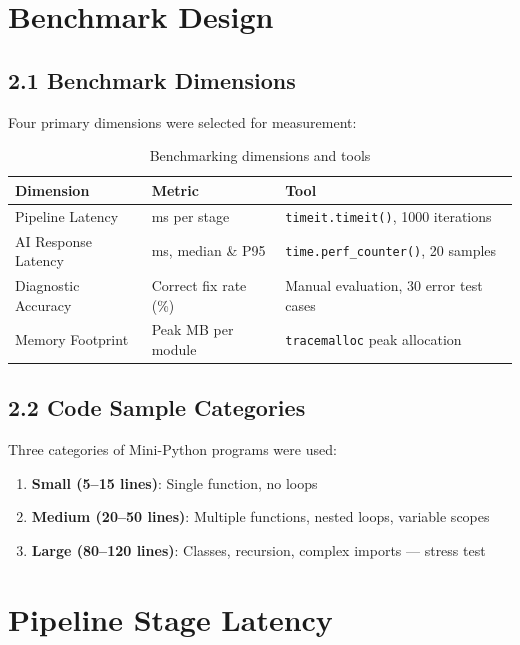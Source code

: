 \documentclass[a4paper,11pt]{article}
\begin{document}
\section{Benchmark Design}

\subsection{2.1 Benchmark Dimensions}

Four primary dimensions were selected for measurement:

\begin{table}[h]
\centering
\begin{tabularx}{\textwidth}{|l|l|X|}
\hline
\rowcolor{violet!10}
\textbf{Dimension} & \textbf{Metric} & \textbf{Tool} \\
\hline
Pipeline Latency & ms per stage & \texttt{timeit.timeit()}, 1000 iterations \\
\hline
AI Response Latency & ms, median \& P95 & \texttt{time.perf\_counter()}, 20 samples \\
\hline
Diagnostic Accuracy & Correct fix rate (\%) & Manual evaluation, 30 error test cases \\
\hline
Memory Footprint & Peak MB per module & \texttt{tracemalloc} peak allocation \\
\hline
\end{tabularx}
\caption{Benchmarking dimensions and tools}
\end{table}

\subsection{2.2 Code Sample Categories}

Three categories of Mini-Python programs were used:

\begin{enumerate}
    \item \textbf{Small (5--15 lines)}: Single function, no loops
    \item \textbf{Medium (20--50 lines)}: Multiple functions, nested loops, variable scopes
    \item \textbf{Large (80--120 lines)}: Classes, recursion, complex imports --- stress test
\end{enumerate}

\section{Pipeline Stage Latency}
\end{document}
